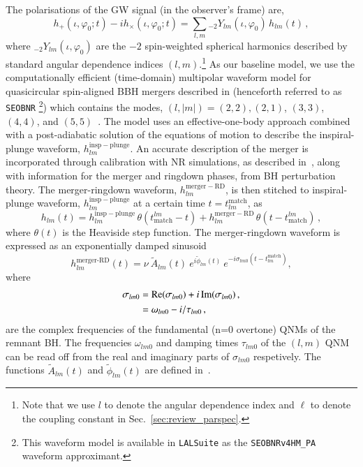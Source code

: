 \documentclass[twocolumn,prd,aps,superscriptaddress,preprintnumbers,tightenlines,showpacs,nofootinbib,eqsecnum,amsfonts,amsmath,longbibliography]{revtex4-1}
\newcommand{\SEOB}{\texttt{SEOBNR}}
\begin{document}
The polarisations of the GW signal (in the observer's frame) are,
%
\begin{equation}
h_+(\iota,\varphi_0;t ) - i h_\times(\iota,\varphi_0;t) = \sum_{l, m} {}_{-\!2}Y_{l m}(\iota,\varphi_0)\, h_{l m}(t)\,,
\end{equation}
%
where ${}_{-\!2}Y_{l m}(\iota,\varphi_0)$ are the $-2$ spin-weighted spherical harmonics described by standard angular dependence indices $(l,m)$.\footnote{Note that we use $l$ to denote the angular dependence index and $\ell$ to denote the coupling constant in Sec.~\ref{sec:review_parspec}.} As our baseline model, we use the computationally efficient (time-domain) multipolar waveform model for quasicircular spin-aligned BBH mergers described in \cite{Mihaylov:2021bpf} (henceforth referred to as \SEOB{} \footnote{This waveform model is available in \texttt{LALSuite} \cite{lalsuite} as the \texttt{SEOBNRv4HM\_PA} waveform approximant.}) which contains the modes, $(l, |m|)=(2,2),(2,1)$, $(3,3)$, $(4,4)$, and $(5,5)$~\cite{Cotesta:2018fcv,Mihaylov:2021bpf}. The model uses an effective-one-body approach combined with a post-adiabatic solution of the equations of motion to describe the inspiral-plunge waveform, $h_{l m}^\mathrm{insp-plunge}$. An accurate description of the merger is incorporated through calibration with NR simulations, as described in~\cite{Cotesta:2018fcv}, along with information for the merger and ringdown phases, from BH perturbation theory. The merger-ringdown waveform, $h_{l m}^\mathrm{merger-RD}$, is then stitched to inspiral-plunge waveform, $h_{l m}^\mathrm{insp-plunge}$ at a certain time $t = t^{\textrm{match}}_{l m}$, as
%
\begin{equation}
h_{l m}(t) = h_{l m}^\mathrm{insp-plunge}\, \theta(t_\mathrm{match}^{l m} - t) + h_{l m}^\mathrm{merger-RD}\,\theta(t-t_\mathrm{match}^{l m})\,,
\end{equation}
%
where $\theta(t)$ is the Heaviside step function. The merger-ringdown waveform is expressed as an exponentially damped sinusoid ~\citep{Bohe:2016gbl,Cotesta:2018fcv,Mihaylov:2021bpf}
%
\begin{equation}
\label{RD}
h_{l m}^{\textrm{merger-RD}}(t) = \nu \ \tilde{A}_{l m}(t)\ e^{i \tilde{\phi}_{l m}(t)} \ e^{-i \sigma_{l m 0}(t-t^{\textrm{match}}_{l m})},
\end{equation}
%
where
%
\begin{align}
\sigma_{l m 0} &= {\rm Re}(\sigma_{l m 0}) + i \, {\rm Im}(\sigma_{l m 0})\,,
\nonumber \\
&= \omega_{l m 0} - i / \tau_{l m 0}\,,
\end{align}
%
are the complex frequencies of the fundamental (n=0 overtone) QNMs of the remnant BH. The frequencies $\omega_{l m 0}$ and damping times $\tau_{l m 0}$ of the $(l, m)$ QNM can be read off from the real and imaginary parts of  $\sigma_{l m0}$ respetively. The functions $\tilde{A}_{l m}(t)$ and $\tilde{\phi}_{l m}(t)$ are defined in~\cite{Bohe:2016gbl,Cotesta:2018fcv}.
\end{document}
